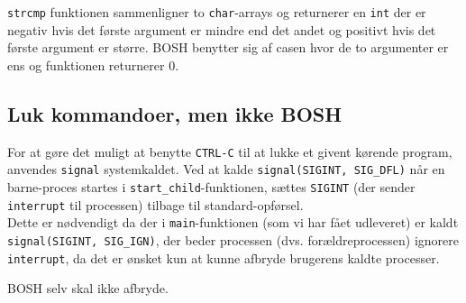 \texttt{strcmp} funktionen sammenligner to \texttt{char}-arrays og returnerer en \texttt{int} der er negativ hvis det første argument er mindre end det andet og positivt hvis det første argument er større. BOSH benytter sig af casen hvor de to argumenter er ens og funktionen returnerer 0.

\subsection{Luk kommandoer, men ikke BOSH}
For at gøre det muligt at benytte \texttt{CTRL-C} til at lukke et givent kørende program, anvendes \texttt{signal} systemkaldet. Ved at kalde \texttt{signal(SIGINT, SIG\_DFL)} når en barne-proces startes i \texttt{start\_child}-funktionen, sættes \texttt{SIGINT} (der sender \texttt{interrupt} til processen) tilbage til standard-opførsel.\\

Dette er nødvendigt da der i \texttt{main}-funktionen (som vi har fået udleveret) er kaldt \texttt{signal(SIGINT, SIG\_IGN)}, der beder processen (dvs. forældreprocessen) ignorere \texttt{interrupt}, da det er ønsket kun at kunne afbryde brugerens kaldte processer. 

BOSH selv skal ikke afbryde.
